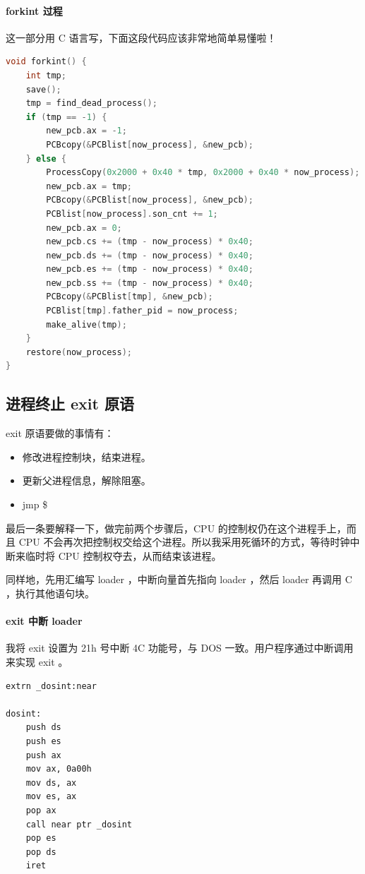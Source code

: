 \documentclass{article}
\begin{document}
\paragraph{forkint 过程}

这一部分用 C 语言写，下面这段代码应该非常地简单易懂啦！

\begin{lstlisting}[language=C++]
void forkint() {
	int tmp;
	save();
	tmp = find_dead_process();
	if (tmp == -1) {
		new_pcb.ax = -1;
		PCBcopy(&PCBlist[now_process], &new_pcb);
	} else {
		ProcessCopy(0x2000 + 0x40 * tmp, 0x2000 + 0x40 * now_process);
		new_pcb.ax = tmp;
		PCBcopy(&PCBlist[now_process], &new_pcb);
		PCBlist[now_process].son_cnt += 1;
		new_pcb.ax = 0;
		new_pcb.cs += (tmp - now_process) * 0x40;
		new_pcb.ds += (tmp - now_process) * 0x40;
		new_pcb.es += (tmp - now_process) * 0x40;
		new_pcb.ss += (tmp - now_process) * 0x40;
		PCBcopy(&PCBlist[tmp], &new_pcb);
		PCBlist[tmp].father_pid = now_process;
		make_alive(tmp);
	}
	restore(now_process);
}
\end{lstlisting}

\subsection{进程终止 exit 原语}

exit 原语要做的事情有：

\begin{itemize}
\item 修改进程控制块，结束进程。
\item 更新父进程信息，解除阻塞。
\item jmp \$
\end{itemize}

最后一条要解释一下，做完前两个步骤后，CPU 的控制权仍在这个进程手上，而且 CPU 不会再次把控制权交给这个进程。所以我采用死循环的方式，等待时钟中断来临时将 CPU 控制权夺去，从而结束该进程。


同样地，先用汇编写 loader ，中断向量首先指向 loader ，然后 loader 再调用 C ，执行其他语句块。

\paragraph{exit 中断 loader}

我将 exit 设置为 21h 号中断 4C 功能号，与 DOS 一致。用户程序通过中断调用来实现 exit 。

\begin{lstlisting}[language={[x86masm]Assembler}]
extrn _dosint:near

dosint:
	push ds
	push es
	push ax
	mov ax, 0a00h
	mov ds, ax
	mov es, ax
	pop ax
	call near ptr _dosint
	pop es
	pop ds
	iret
\end{lstlisting}
\end{document}
